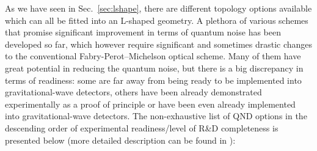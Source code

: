 As we have seen in Sec.~\ref{sec:lshape}, there are different topology options available which can all be fitted into an L-shaped geometry. A plethora of various schemes that promise significant improvement in terms of quantum noise has been developed so far, which however require significant and sometimes drastic changes to 
the conventional Fabry-Perot--Michelson optical scheme. Many of them have great potential in reducing the quantum noise, but there is a big discrepancy in terms of readiness: some are far away from being ready to be implemented into gravitational-wave detectors, others have been already demonstrated experimentally as a proof of principle or have been even already implemented into gravitational-wave detectors. 
The non-exhaustive list of QND options in the descending order of experimental readiness/level of R\&D completeness 
 is presented below (more detailed description can be found in \cite{2019_LivRevRel_Danilishin}):
